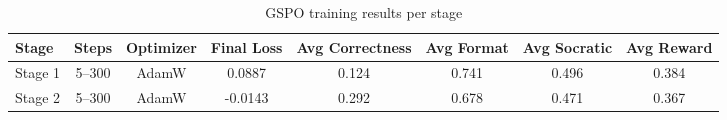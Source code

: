 \begin{table}[h]
\centering
\caption{GSPO training results per stage}
\label{tab:gspo_results}
\begin{tabular}{lccccccc}
\toprule
Stage & Steps & Optimizer & Final Loss & Avg Correctness & Avg Format & Avg Socratic & Avg Reward \\
\midrule
Stage 1 & 5--300 & AdamW & 0.0887 & 0.124 & 0.741 & 0.496 & 0.384 \\
Stage 2 & 5--300 & AdamW & -0.0143 & 0.292 & 0.678 & 0.471 & 0.367 \\
\bottomrule
\end{tabular}
\end{table}